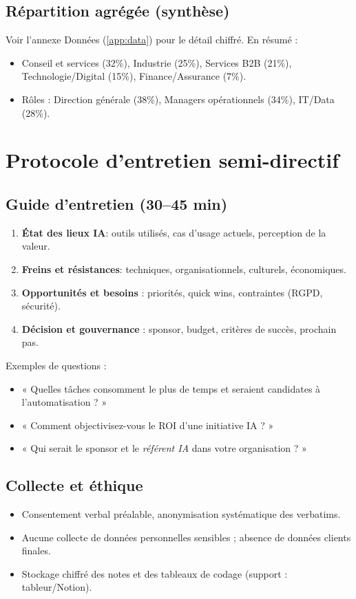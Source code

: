 \subsection{Répartition agrégée (synthèse)}
Voir l'annexe Données (\ref{app:data}) pour le détail chiffré. En résumé :
\begin{itemize}
    \item Conseil et services (32\%), Industrie (25\%), Services B2B (21\%), Technologie/Digital (15\%), Finance/Assurance (7\%).
    \item Rôles : Direction générale (38\%), Managers opérationnels (34\%), IT/Data (28\%).
\end{itemize}

\section{Protocole d'entretien semi-directif}
\subsection{Guide d'entretien (30–45 min)}
\begin{enumerate}
    \item \textbf{État des lieux IA}: outils utilisés, cas d'usage actuels, perception de la valeur.
    \item \textbf{Freins et résistances}: techniques, organisationnels, culturels, économiques.
    \item \textbf{Opportunités et besoins} : priorités, quick wins, contraintes (RGPD, sécurité).
    \item \textbf{Décision et gouvernance} : sponsor, budget, critères de succès, prochain pas.
\end{enumerate}
Exemples de questions :
\begin{itemize}
    \item « Quelles tâches consomment le plus de temps et seraient candidates à l'automatisation ? »
    \item « Comment objectivisez-vous le ROI d'une initiative IA ? »
    \item « Qui serait le sponsor et le \emph{référent IA} dans votre organisation ? »
\end{itemize}

\subsection{Collecte et éthique}
\begin{itemize}
    \item Consentement verbal préalable, anonymisation systématique des verbatims.
    \item Aucune collecte de données personnelles sensibles ; absence de données clients finales.
    \item Stockage chiffré des notes et des tableaux de codage (support : tableur/Notion).
\end{itemize}

